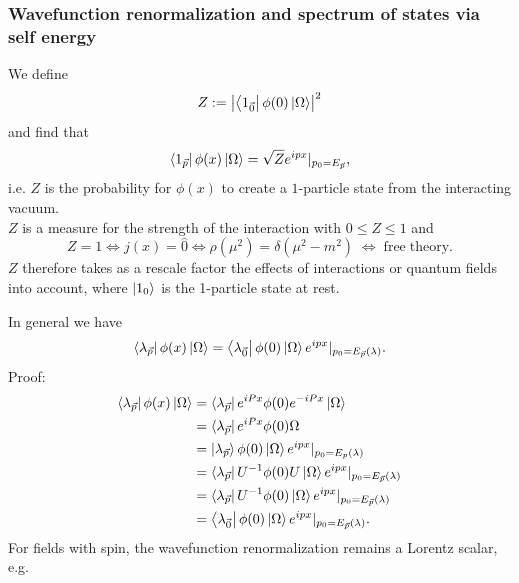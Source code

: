 \subsubsection{Wavefunction renormalization and spectrum of states via self energy}
\begin{mybox}{}
	We define
	\begin{equation}
		\label{eq:wavefunctionrenormalization}
		Z:= \abs{\bra{1_{\vec{0}} } \phi(0) \ket{\Omega}}^2
	\end{equation}
	and find that
	\begin{equation}
	\label{eq:statesWavefunctionRenorm}
	\bra{1_{\vec{p}} }\phi(x) \ket{\Omega} = \sqrt{Z} e^{ipx} |_{p_0 = E_{\vec{p}}},
	\end{equation}
	i.e. $Z$ is the probability for $\phi(x)$ to create a $1$-particle state from the interacting vacuum.\\
	$Z$ is a measure for the strength of the interaction with $0\leq Z\leq 1$ and
	\begin{equation}
		Z=1 \Leftrightarrow j(x) = \hat{ 0}\Leftrightarrow \rho(\mu^2) = \delta(\mu^2-m^2) \;\Leftrightarrow\; \mathrm{free\;theory}.
	\end{equation}
	$Z$ therefore takes as a rescale factor the effects of interactions or quantum fields into account,
	where $\ket{1_0}$ is the 1-particle state at rest.
\end{mybox}
In general we have
\begin{equation}
	\bra{\lambda_{\vec{p}} }\phi(x) \ket{\Omega} = \bra{\lambda_{\vec{0}}} \phi(0) \ket{\Omega} e^{ipx} |_{p_0 = E_{\vec{p}}(\lambda)}.
\end{equation}
Proof:\\
\begin{align*}
	\bra{\lambda_{\vec{p}}}\phi(x) \ket{\Omega} &= \bra{\lambda_{\vec{p}}}e^{iPx} \phi(0) e^{-iPx} \ket{\Omega}\\
	&= \bra{\lambda_{\vec{p}}} e^{iPx} \phi(0) \Omega \\
	&= \ket{\lambda_{\vec{p}}} \phi(0) \ket{\Omega} e^{ipx} |_{p_0 = E_p(\lambda)}\\
	&= \bra{\lambda_{\vec{p}}} U^{-1} \phi(0) U \ket{\Omega} e^{ipx} |_{p_0=E_{\vec{p}}(\lambda)}\\
	&= \bra{\lambda_{\vec{p}}} U^{-1} \phi(0) \ket{\Omega} e^{ipx} |_{p_0 =E_{\vec{p}}(\lambda)}\\
	&=\bra{\lambda_{\vec{0}}} \phi(0) \ket{\Omega} e^{ipx} |_{p_0 =E_{\vec{p}}(\lambda)}.
\end{align*}
For fields with spin, the wavefunction renormalization remains a Lorentz scalar, e.g.
